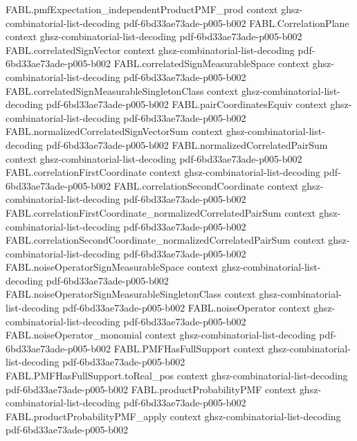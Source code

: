\begin{theorem}
\proofstep
  {FABL.pmfExpectation_independentProductPMF_prod}
  {context}
  {ghsz-combinatorial-list-decoding}
  {pdf-6bd33ae73ade-p005-b002}
\proofstep
  {FABL.CorrelationPlane}
  {context}
  {ghsz-combinatorial-list-decoding}
  {pdf-6bd33ae73ade-p005-b002}
\proofstep
  {FABL.correlatedSignVector}
  {context}
  {ghsz-combinatorial-list-decoding}
  {pdf-6bd33ae73ade-p005-b002}
\proofstep
  {FABL.correlatedSignMeasurableSpace}
  {context}
  {ghsz-combinatorial-list-decoding}
  {pdf-6bd33ae73ade-p005-b002}
\proofstep
  {FABL.correlatedSignMeasurableSingletonClass}
  {context}
  {ghsz-combinatorial-list-decoding}
  {pdf-6bd33ae73ade-p005-b002}
\proofstep
  {FABL.pairCoordinatesEquiv}
  {context}
  {ghsz-combinatorial-list-decoding}
  {pdf-6bd33ae73ade-p005-b002}
\proofstep
  {FABL.normalizedCorrelatedSignVectorSum}
  {context}
  {ghsz-combinatorial-list-decoding}
  {pdf-6bd33ae73ade-p005-b002}
\proofstep
  {FABL.normalizedCorrelatedPairSum}
  {context}
  {ghsz-combinatorial-list-decoding}
  {pdf-6bd33ae73ade-p005-b002}
\proofstep
  {FABL.correlationFirstCoordinate}
  {context}
  {ghsz-combinatorial-list-decoding}
  {pdf-6bd33ae73ade-p005-b002}
\proofstep
  {FABL.correlationSecondCoordinate}
  {context}
  {ghsz-combinatorial-list-decoding}
  {pdf-6bd33ae73ade-p005-b002}
\proofstep
  {FABL.correlationFirstCoordinate_normalizedCorrelatedPairSum}
  {context}
  {ghsz-combinatorial-list-decoding}
  {pdf-6bd33ae73ade-p005-b002}
\proofstep
  {FABL.correlationSecondCoordinate_normalizedCorrelatedPairSum}
  {context}
  {ghsz-combinatorial-list-decoding}
  {pdf-6bd33ae73ade-p005-b002}
\proofstep
  {FABL.noiseOperatorSignMeasurableSpace}
  {context}
  {ghsz-combinatorial-list-decoding}
  {pdf-6bd33ae73ade-p005-b002}
\proofstep
  {FABL.noiseOperatorSignMeasurableSingletonClass}
  {context}
  {ghsz-combinatorial-list-decoding}
  {pdf-6bd33ae73ade-p005-b002}
\proofstep
  {FABL.noiseOperator}
  {context}
  {ghsz-combinatorial-list-decoding}
  {pdf-6bd33ae73ade-p005-b002}
\proofstep
  {FABL.noiseOperator_monomial}
  {context}
  {ghsz-combinatorial-list-decoding}
  {pdf-6bd33ae73ade-p005-b002}
\proofstep
  {FABL.PMFHasFullSupport}
  {context}
  {ghsz-combinatorial-list-decoding}
  {pdf-6bd33ae73ade-p005-b002}
\proofstep
  {FABL.PMFHasFullSupport.toReal_pos}
  {context}
  {ghsz-combinatorial-list-decoding}
  {pdf-6bd33ae73ade-p005-b002}
\proofstep
  {FABL.productProbabilityPMF}
  {context}
  {ghsz-combinatorial-list-decoding}
  {pdf-6bd33ae73ade-p005-b002}
\proofstep
  {FABL.productProbabilityPMF_apply}
  {context}
  {ghsz-combinatorial-list-decoding}
  {pdf-6bd33ae73ade-p005-b002}

\end{theorem}
